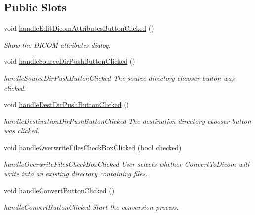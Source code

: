 \subsection*{Public Slots}
\begin{DoxyCompactItemize}
\item 
\mbox{\label{class_main_window_a24cbc2d86087096b6b0212ea98008bc4}} 
void \hyperlink{class_main_window_a24cbc2d86087096b6b0212ea98008bc4}{handle\+Edit\+Dicom\+Attributes\+Button\+Clicked} ()
\begin{DoxyCompactList}\small\item\em Show the D\+I\+C\+OM attributes dialog. \end{DoxyCompactList}\item 
void \hyperlink{class_main_window_ac4c08658eff907f63479a31e94c1b76a}{handle\+Source\+Dir\+Push\+Button\+Clicked} ()
\begin{DoxyCompactList}\small\item\em handle\+Source\+Dir\+Push\+Button\+Clicked The source directory chooser button was clicked. \end{DoxyCompactList}\item 
void \hyperlink{class_main_window_a42f6da35303ef73e55320c807b598d3c}{handle\+Dest\+Dir\+Push\+Button\+Clicked} ()
\begin{DoxyCompactList}\small\item\em handle\+Destination\+Dir\+Push\+Button\+Clicked The destination directory chooser button was clicked. \end{DoxyCompactList}\item 
void \hyperlink{class_main_window_abbc2f350f4207ce69a8ce16ad4b32bb4}{handle\+Overwrite\+Files\+Check\+Box\+Clicked} (bool checked)
\begin{DoxyCompactList}\small\item\em handle\+Overwrite\+Files\+Check\+Box\+Clicked User selects whether Convert\+To\+Dicom will write into an existing directory containing files. \end{DoxyCompactList}\item 
\mbox{\label{class_main_window_a899a5aace9eadd6146887172fb1050ed}} 
void \hyperlink{class_main_window_a899a5aace9eadd6146887172fb1050ed}{handle\+Convert\+Button\+Clicked} ()
\begin{DoxyCompactList}\small\item\em handle\+Convert\+Button\+Clicked Start the conversion process. \end{DoxyCompactList}\item 

\end{DoxyCompactItemize}
